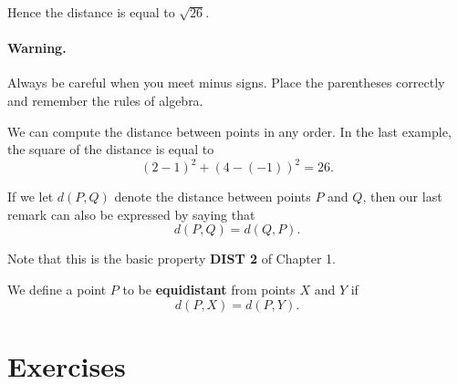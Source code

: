 \documentclass[12pt]{book} %
\begin{document}
Hence the distance is equal to $\sqrt{26}$.

\paragraph{Warning.}
Always be careful when you meet minus signs. Place the parentheses correctly and remember the rules of algebra.

We can compute the distance between points in any order. In the last example, the square of the distance is equal to
\[
(2-1)^2+(4-(-1))^2=26.
\]

If we let $d(P,Q)$ denote the distance between points $P$ and $Q$, then our last remark can also be expressed by saying that
\[
d(P,Q)=d(Q,P).
\]

Note that this is the basic property \textbf{DIST 2} of Chapter 1.

We define a point $P$ to be \textbf{equidistant} from points $X$ and $Y$ if
\[
d(P,X)=d(P,Y).
\]

\section*{Exercises}
\end{document}
